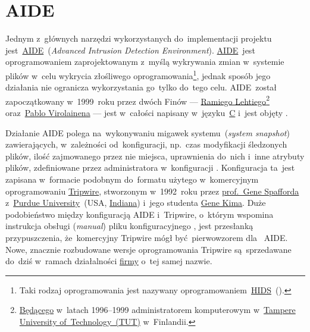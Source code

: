 \documentclass[thesis]{subfiles}
\begin{document}

\section{AIDE}
\label{sec:aide}

Jednym z~głównych narzędzi wykorzystanych do~implementacji projektu jest~\href{http://aide.sourceforge.net/}{AIDE}~(\emph{Advanced Intrusion Detection Environment}). \href{https://wiki.archlinux.org/index.php/AIDE}{AIDE}~jest oprogramowaniem zaprojektowanym z~myślą wykrywania zmian w~systemie plików w~celu wykrycia złośliwego oprogramowania\footnote{Taki rodzaj oprogramowania jest nazywany oprogramowaniem~\href{https://en.wikipedia.org/wiki/Host-based_intrusion_detection_system_comparison}{HIDS}~().}, jednak sposób jego działania nie ogranicza wykorzystania go~tylko do~tego celu. AIDE~został zapoczątkowany w~1999~roku przez dwóch Finów --- \href{http://www.ipi.fi/~rammer/cv.html}{Ramiego Lehtiego}\footnote{\href{http://www.ipi.fi/~rammer/cv.html}{Będącego} w~latach 1996--1999 administratorem komputerowym w~\href{http://www.tut.fi/en}{Tampere University of~Technology~(TUT)} w~Finlandii.} oraz~\href{https://www.linkedin.com/in/pablo-virolainen-73501731/}{Pablo Virolainena} --- jest w~całości napisany w~języku~\href{https://en.wikipedia.org/wiki/C_(programming_language)}{C} i~jest objęty .

Działanie AIDE polega na~wykonywaniu migawek systemu~(\emph{system snapshot}) zawierających, w~zależności od~konfiguracji, np.~czas modyfikacji śledzonych plików, ilość zajmowanego przez nie miejsca, uprawnienia do~nich i~inne atrybuty plików, zdefiniowane przez administratora w~konfiguracji \href{https://linux.die.net/man/5/aide.conf}{}. Konfiguracja ta~jest zapisana w~formacie podobnym do~formatu użytego w~komercyjnym oprogramowaniu \href{https://en.wikipedia.org/wiki/Open_Source_Tripwire}{Tripwire}, stworzonym w~1992~roku przez \href{https://en.wikipedia.org/wiki/Gene_Spafford}{prof.~Gene Spafforda} z~\href{https://en.wikipedia.org/wiki/Purdue_University}{Purdue University}~(USA, \href{https://en.wikipedia.org/wiki/Indiana}{Indiana}) i~jego studenta \href{https://en.wikipedia.org/wiki/Gene_Kim}{Gene Kima}. Duże podobieństwo między konfiguracją AIDE i~Tripwire, o~którym wspomina instrukcja obsługi (\emph{\gls{manual}}) pliku konfiguracyjnego , jest przesłanką przypuszczenia, że~komercyjny Tripwire mógł być~pierwowzorem dla~ AIDE. Nowe, znacznie rozbudowane wersje oprogramowania Tripwire są~sprzedawane do~dziś w~ramach działalności \href{https://en.wikipedia.org/wiki/Tripwire_(company)}{firmy} o~tej samej nazwie.
\end{document}
